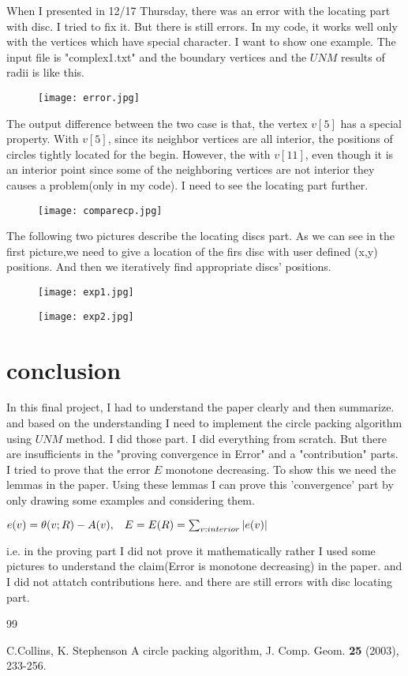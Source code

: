 \documentclass{SOP_KimMoran}
\begin{document}
When I presented in 12/17 Thursday, there was an error with the locating part with disc. I tried to fix it. But there is still errors. In my code, it works well only with the vertices which have special character. I want to show one example. The input file is "complex1.txt" and the boundary vertices and the $UNM$ results of radii is like this.
\begin{figure}[H]
  \texttt{[image: error.jpg]}
\end{figure}
The output difference between the two case is that, the vertex $v[5]$ has a special property. With $v[5]$, since its neighbor vertices are all interior, the positions of circles tightly located for the begin. However, the with $v[11]$, even though it
is an interior point since some of the neighboring vertices are not interior they causes a problem(only in my code). I need to see the locating part further.
\begin{figure}[H]
  \texttt{[image: comparecp.jpg]}
\end{figure}
The following two pictures describe the locating discs part. As we can see in the first picture,we need to give a location of the firs disc with user defined (x,y) positions. And then we iteratively find appropriate discs' positions. 
\begin{figure}[H]
  \texttt{[image: exp1.jpg]}
\end{figure}
\begin{figure}[H]
  \texttt{[image: exp2.jpg]}
\end{figure}

\section{conclusion}
In this final project, I had to understand the paper clearly and then summarize. and based on the understanding I need to implement the circle packing algorithm using $UNM$ method. I did those part. I did everything from scratch.  But there are insufficients in the "proving convergence in Error" and a "contribution" parts. I tried to prove that the error $E$ monotone decreasing. To show this we need the lemmas in the paper. Using these lemmas I can prove this 'convergence' part by only drawing some examples and considering them.\\
\centerline{$e(v)=\theta(v;R)-A(v), \hspace{0.3cm}E=E(R)=\sum_{v:interior}|e(v)|$}
i.e. in the proving part I did not prove it mathematically rather I used some pictures to understand the claim(Error is monotone decreasing) in the paper. and I did not attatch contributions here. and there are still errors with disc locating part.  
\begin{thebibliography} {99}

 C.Collins, K. Stephenson
{A circle packing algorithm},
 J. Comp. Geom. {\bf 25} (2003), 233-256.



\end{thebibliography}
\end{document}
